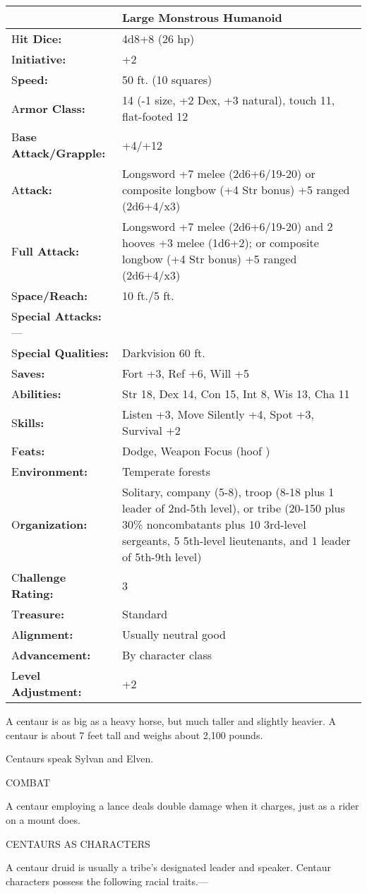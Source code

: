 \documentclass{article}
\begin{document}
\begin{tabular}{|>{\raggedright}p{91pt}|>{\raggedright}p{231pt}|}
\hline
  & Large Monstrous Humanoid\tabularnewline
\hline
H\textbf{it Dice:} & 4d8+8 (26 hp)\tabularnewline
\hline
I\textbf{nitiative:} & +2\tabularnewline
\hline
S\textbf{peed:} & 50 ft. (10 squares)\tabularnewline
\hline
A\textbf{rmor Class:} & 14 (-1 size, +2 Dex, +3 natural), touch 11, flat-footed 
12\tabularnewline
\hline
B\textbf{ase Attack/Grapple:} & +4/+12\tabularnewline
\hline
A\textbf{ttack:} & Longsword +7 melee (2d6+6/19-20) or composite longbow (+4 Str 
bonus) +5 ranged (2d6+4/x3)\tabularnewline
\hline
F\textbf{ull Attack:} & Longsword +7 melee (2d6+6/19-20) and 2 hooves +3 melee 
(1d6+2); or composite longbow (+4 Str bonus) +5 ranged (2d6+4/x3)\tabularnewline
\hline
S\textbf{pace/Reach:} & 10 ft./5 ft.\tabularnewline
\hline
S\textbf{pecial Attacks:}--- & \tabularnewline
\hline
S\textbf{pecial Qualities:} & Darkvision 60 ft.\tabularnewline
\hline
S\textbf{aves:} & Fort +3, Ref +6, Will +5\tabularnewline
\hline
A\textbf{bilities:} & Str 18, Dex 14, Con 15, Int 8, Wis 13, Cha 11\tabularnewline
\hline
S\textbf{kills:} & Listen +3, Move Silently +4, Spot +3, Survival +2 \tabularnewline
\hline
F\textbf{eats:} & Dodge, Weapon Focus (hoof )\tabularnewline
\hline
E\textbf{nvironment:} & Temperate forests\tabularnewline
\hline
O\textbf{rganization:} & Solitary, company (5-8), troop (8-18 plus 1 leader of 
2nd-5th level), or tribe (20-150 plus 30\% noncombatants plus 10 3rd-level sergeants, 
5 5th-level lieutenants, and 1 leader of 5th-9th level)\tabularnewline
\hline
C\textbf{hallenge Rating:} & 3\tabularnewline
\hline
T\textbf{reasure:} & Standard\tabularnewline
\hline
A\textbf{lignment:} & Usually neutral good\tabularnewline
\hline
A\textbf{dvancement:} & By character class\tabularnewline
\hline
L\textbf{evel Adjustment:} & +2\tabularnewline
\hline
\end{tabular}

A centaur is as big as a heavy horse, but much taller and slightly heavier. A centaur 
is about 7 feet tall and weighs about 2,100 pounds.

Centaurs speak Sylvan and Elven.

COMBAT

A centaur employing a lance deals double damage when it charges, just as a rider 
on a mount does.

CENTAURS AS CHARACTERS

A centaur druid is usually a tribe's designated leader and speaker. Centaur characters 
possess the following racial traits.--- 
\end{document}
